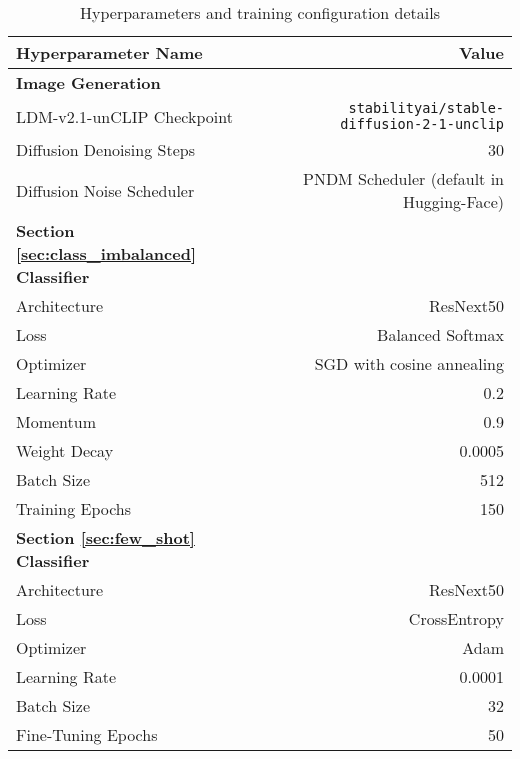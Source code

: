 \begin{table*}[h!]
    \centering
    \begin{tabular}{@{}lr@{}}
        \toprule
        \textbf{Hyperparameter Name} & \textbf{Value} \\
        \midrule
        \midrule
        
        \textbf{Image Generation} \vspace{0.1cm} \\ 
        LDM-v2.1-unCLIP Checkpoint & \texttt{stabilityai/stable-diffusion-2-1-unclip} \\
        Diffusion Denoising Steps & 30 \\
        Diffusion Noise Scheduler & PNDM Scheduler \cite{pndm_scheduler} (default in Hugging-Face) \vspace{0.1cm} \\

        \midrule
        \textbf{Section \ref{sec:class_imbalanced} Classifier} \vspace{0.1cm} \\ 
        Architecture & ResNext50 \\
        Loss & Balanced Softmax \cite{balanced_softmax} \\
        Optimizer &  SGD with cosine annealing \cite{sgd_cosine} \\
        Learning Rate & 0.2 \\
        Momentum & 0.9 \\
        Weight Decay & 0.0005 \\
        Batch Size & 512 \\
        Training Epochs & 150 \vspace{0.1cm} \\

        \midrule
        \textbf{Section \ref{sec:few_shot} Classifier \vspace{0.1cm}} \\
        Architecture & ResNext50 \\
        Loss & CrossEntropy \\
        Optimizer & Adam \\
        Learning Rate & 0.0001 \\
        Batch Size & 32 \\
        Fine-Tuning Epochs & 50 \vspace{0.1cm} \\
        \bottomrule
    \end{tabular}
    \caption{Hyperparameters and training configuration details}
    \label{table:hparams}
\end{table*}

